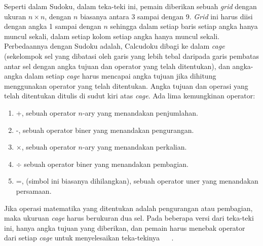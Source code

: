 \documentclass[a4paper,twoside]{article}
\begin{document}
\begin{enumerate}
Seperti dalam Sudoku, dalam teka-teki ini, pemain diberikan sebuah \textit{grid} dengan ukuran \begin{math}n \times n\end{math}, dengan \begin{math}n\end{math} biasanya antara 3 sampai dengan 9. \textit{Grid} ini harus diisi dengan angka 1 sampai dengan \begin{math}n\end{math} sehingga dalam setiap baris setiap angka hanya muncul sekali, dalam setiap kolom setiap angka hanya muncul sekali. Perbedaannya dengan Sudoku adalah, Calcudoku dibagi ke dalam \textit{cage} (sekelompok sel yang dibatasi oleh garis yang lebih tebal daripada garis pembatas antar sel dengan angka tujuan dan operator yang telah ditentukan), dan angka-angka dalam setiap \textit{cage}  harus mencapai angka tujuan jika dihitung menggunakan operator yang telah ditentukan. Angka tujuan dan operasi yang telah ditentukan ditulis di sudut kiri atas \textit{cage}. Ada lima kemungkinan operator:
\begin{enumerate}
\item +, sebuah operator \begin{math}n\end{math}-ary yang menandakan penjumlahan.
\item -, sebuah operator biner yang menandakan pengurangan.
\item \begin{math}\times\end{math}, sebuah operator  \begin{math}n\end{math}-ary yang menandakan perkalian.
\item \begin{math}\div\end{math} sebuah operator biner yang menandakan pembagian.
\item =, (simbol ini biasanya dihilangkan), sebuah operator uner yang menandakan persamaan.
\end{enumerate}
Jika operasi matematika yang ditentukan adalah pengurangan atau pembagian, maka ukuruan \textit{cage} harus berukuran dua sel. Pada beberapa versi dari teka-teki ini, hanya angka tujuan yang diberikan, dan pemain harus menebak operator dari setiap \textit{cage} untuk menyelesaikan teka-tekinya ~\cite{Fahda} ~\cite{JohannaLukasSaputra}.


\end{enumerate}
\end{document}
